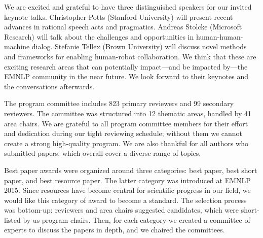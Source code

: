 We are excited and grateful to have three distinguished speakers for our invited keynote talks. Christopher Potts (Stanford University) will present recent advances in rational speech acts and pragmatics. Andreas Stolcke (Microsoft Research) will talk about the challenges and opportunities in human-human-machine dialog. Stefanie Tellex (Brown University) will discuss novel methods and frameworks for enabling human-robot collaboration. We think that these are exciting research areas that can potentially impact---and be impacted by---the EMNLP community in the near future. We look forward to their keynotes and the conversations afterwards. 








The program committee includes 823 primary reviewers and 99 secondary reviewers. 
The committee was structured into 12 thematic areas, handled by 41 area chairs. We are
grateful to all program committee members for their effort and dedication during our tight reviewing schedule; without them we cannot create a strong high-quality program. 
We are also thankful for all authors who submitted papers, which overall cover a diverse range of topics. 



Best paper awards were organized around three categories: best 
paper, best short paper, and best resource paper. The latter category
was introduced at EMNLP 2015. Since resources have become central for
scientific progress in our field, we would like this category of award
to become a standard. The selection process was bottom-up: reviewers
and area chairs suggested candidates, which were short-listed by us program chairs. 
Then, for each category we created a
committee of experts to discuss the papers in depth, and we chaired the committees. 

